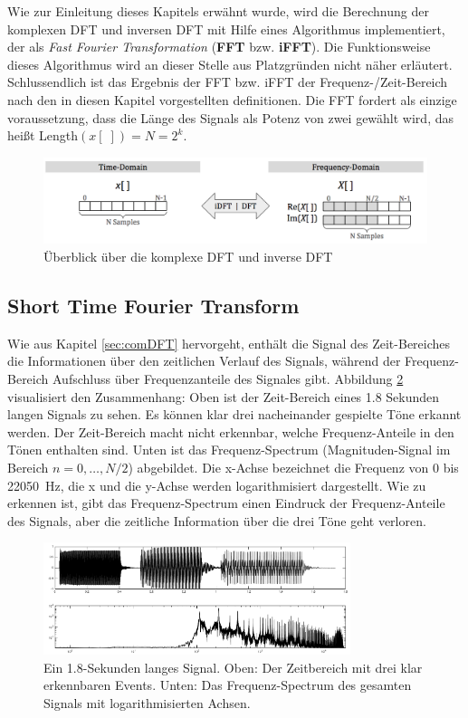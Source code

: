  
Wie zur Einleitung dieses Kapitels erwähnt wurde, wird die Berechnung der komplexen DFT und inversen DFT mit Hilfe eines Algorithmus implementiert, der als \emph{Fast Fourier Transformation} (\textbf{FFT} bzw. \textbf{iFFT}). Die Funktionsweise dieses Algorithmus wird an dieser Stelle aus Platzgründen nicht näher erläutert. Schlussendlich ist das Ergebnis der FFT bzw. iFFT der Frequenz-/Zeit-Bereich nach den in diesen Kapitel vorgestellten definitionen. Die FFT fordert als einzige voraussetzung, dass die Länge des Signals als Potenz von zwei gewählt wird, das heißt Length$(x[\;]) = N = 2^k$. \cite[S. 225 - 226]{dspGuide}

\begin{figure}[h]
	\centering
	\includegraphics[width=1\textwidth]{bilder/compDFTOverview02.png}
	\caption{Überblick über die komplexe DFT und inverse DFT}
	\label{img:complexDFTOverview}
\end{figure}

\subsection{Short Time Fourier Transform}

Wie aus Kapitel \ref{sec:comDFT} hervorgeht, enthält die Signal des Zeit-Bereiches die Informationen über den zeitlichen Verlauf des Signals, während der Frequenz-Bereich Aufschluss über Frequenzanteile des Signales gibt. Abbildung \ref{img:stft01} visualisiert den Zusammenhang: Oben ist der Zeit-Bereich eines 1.8 Sekunden langen Signals zu sehen. Es können klar drei nacheinander gespielte Töne erkannt werden. Der Zeit-Bereich macht nicht erkennbar, welche Frequenz-Anteile in den Tönen enthalten sind. Unten ist das Frequenz-Spectrum (Magnituden-Signal im Bereich  $n = 0 ,\ldots, N/2$) abgebildet. Die x-Achse bezeichnet die Frequenz von 0 bis \SI{22050}{\hertz}, die x und die y-Achse werden logarithmisiert dargestellt. Wie zu erkennen ist, gibt das Frequenz-Spectrum einen Eindruck der Frequenz-Anteile des Signals, aber die zeitliche Information über die drei Töne geht verloren.

 \begin{figure}[h]
	\centering
	\includegraphics[width=0.8\textwidth]{bilder/stft01.png}
	\caption{Ein 1.8-Sekunden langes Signal. Oben: Der Zeitbereich mit drei klar erkennbaren Events. Unten: Das Frequenz-Spectrum des gesamten Signals mit logarithmisierten Achsen.}
	\label{img:stft01}
\end{figure}

